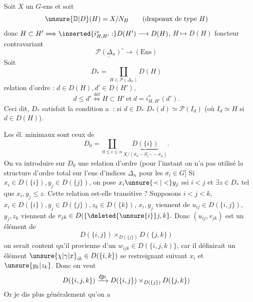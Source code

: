 Soit $X$ un $G$-ens et soit
\[
\unsure{\mathbb D|D}(H)=X/N_H\qquad\text{(drapeaux de type }H\text{)}
\]
donc $H\subset H'\Longrightarrow\inserted{i_{H,H'}^*:}D(H')\longrightarrow D(H)$,
$H\longmapsto D(H)$ foncteur contravariant
\[
\underline{\mathscr P(\Delta_n)}^{\circ}\longrightarrow(\mathrm{Ens})
\]
Soit
\[
D_*=\coprod_{H\in\mathscr P(\Delta_n)}D(H)
\]
relation d'ordre : $d\in D(H), d'\in D(H')$,
\[
d\leq d'\mathrel{\overset{\text{déf}}{\Longleftrightarrow}}H\subset H'\ \text{et}\ d=i_{H,H'}^*(d').
\]
Ceci dit, $D_*$ satisfait la condition \textcircled{a} : si $d\in D_*$ $D_*(d)\simeq\mathscr P(I_d)$ (où $I_d\simeq H$ si $d\in D(H)$).

Les él. minimaux sont ceux de
\[
D_0=\coprod_{0\leq i\leq n}\underbrace{D(\{i\})}_{X/(\sigma_0\mathbin{-}\widehat{\sigma_i}\mathbin{--}\sigma_n)}.
\]
On va introduire sur $D_0$ une relation d'ordre (pour l'instant on n'a pas utilisé la structure d'ordre total
sur l'ens d'indices $\Delta_n$ pour les $\sigma_i\in G$] Si  $x_i\in D(\{i\}),y_j\in D(\{j\})$, on pose $x_i\unsure{\prec|<}y_j$ ssi $i<j$ et $\exists z\in D_*$ tel que  $x_i,y_j\leq z$.
Cette relation est-elle transitive ? Supposons $i<j<k$, $x_i\in D(\{i\}),y_j\in D(\{j\}),z_k\in D(\{k\})$,  $x_i,y_j$ viennent de $u_{ij}\in D(\{i,j\})$, $y_j,z_k$ viennent
de $v_{jk}\in D(\{\deleted{\unsure{i}}j,k\}.$ Donc $(u_{ij},v_{jk})$ est un élément de
\[
D(\{i,j\})\mathbin{\times}_{D(\{j\})}D(\{j,k\})
\]
on serait content qu'il provienne d'un  $w_{ijk}\in D(\{i,j,k)\}$, car il  définirait un élément  $\unsure{\chi|\gamma|x}_{ik}\in D(\{i,k\})$  se restreignant suivant $x_i$ et $\unsure{y_k|z_k}$. Donc
on veut
\[
D(\{i,j,k\})\xrightarrow{\text{\textcircled{épi}}}D(\{i,j\})\mathbin{\times}_{D(\{j\})}D(\{j,k\})
\]
Or je dis plus généralement qu'on a

